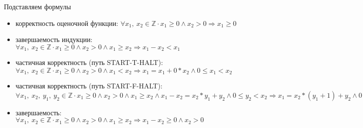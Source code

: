 \documentclass[hyperref={unicode=true}]{beamer}
\begin{document}
    \begin{frame}{Подставляем формулы}
    \begin{itemize}
    \item корректность оценочной функции:
            $\forall x_1,~x_2 \in \mathbb{Z} \cdot
            x_1 \geq 0 \land x_2 > 0
            \Rightarrow
            x_1 \geq 0$
    \item завершаемость индукции:
            $\forall x_1,~x_2 \in \mathbb{Z} \cdot
            x_1 \geq 0 \land x_2 > 0 \land x_1 \geq x_2
            \Rightarrow
            x_1 - x_2 < x_1$
    \item частичная корректность (путь START-T-HALT):
            $\forall x_1,~x_2 \in \mathbb{Z} \cdot
            x_1 \geq 0 \land x_2 > 0 \land x_1 < x_2
            \Rightarrow
            x_1 = x_1 + 0 * x_2 \land 0 \leq x_1 < x_2$
    \item частичная корректность (путь START-F-HALT):
            $\forall x_1,~x_2,~y_1,~y_2 \in \mathbb{Z} \cdot
            x_1 \geq 0 \land x_2 > 0 \land x_1 \geq x_2 \land
            x_1 - x_2 = x_2 * y_1 + y_2 \land 0 \leq y_2 < x_2
            \Rightarrow
            x_1 = x_2 * (y_1 + 1) + y_2 \land 0 \leq y_2 < x_2$
    \item завершаемость:
            $\forall x_1,~x_2 \in \mathbb{Z} \cdot
            x_1 \geq 0 \land x_2 > 0 \land x_1 \geq x_2
            \Rightarrow
            x_1 - x_2 \geq 0 \land x_2 > 0$
    \end{itemize}
    \end{frame}
\end{document}
